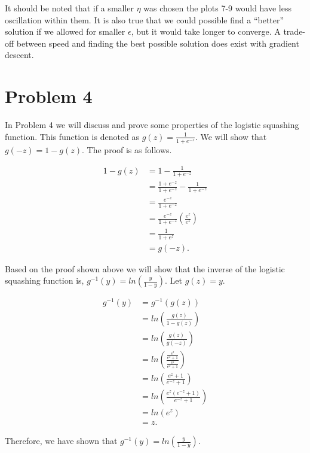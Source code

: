 \documentclass[paper=a4, fontsize=11pt]{scrartcl} %
\begin{document}
It should be noted that if a smaller $\eta$ was chosen the plots 7-9 would have less oscillation within them.
It is also true that we could possible find a ``better'' solution if we allowed for smaller $\epsilon$, but it would take longer to converge.
A trade-off between speed and finding the best possible solution does exist with gradient descent.

\section{Problem 4}

In Problem 4 we will discuss and prove some properties of the logistic squashing function.
This function is denoted as $g(z) = \frac{1}{1 + e^{-z}}$.  We will show that $g(-z) = 1 - g(z)$.  The proof is as follows.

\begin{align*}
1-g(z) &= 1- \frac{1}{1 + e^{-z}} \\
&= \frac{1 + e^{-z}}{1 + e^{-z}}- \frac{1}{1 + e^{-z}} \\
&= \frac{e^{-z}}{1 + e^{-z}} \\
&= \frac{e^{-z}}{1 + e^{-z}}(\frac{e^{z}}{e^{z}}) \\
&= \frac{1}{1 + e^{z}} \\
&= g(-z).
\end{align*}

Based on the proof shown above we will show that the inverse of the logistic squashing function is, $g^{-1}(y) = ln(\frac{y}{1-y})$.  Let $g(z) = y$.

\begin{align*}
g^{-1}(y) &= g^{-1}(g(z)) \\
&= ln(\frac{g(z)}{1-g(z)}) \\
&= ln(\frac{g(z)}{g(-z)}) \\
&= ln(\frac{\frac{e^{z}}{e^{z}+1}}{\frac{e^{z}}{e^{z}+1}}) \\
&= ln(\frac{e^z + 1}{e^{-z} + 1})\\
&= ln(\frac{e^{z}(e^{-z}+1)}{e^{-z}+1})\\
&= ln(e^{z})\\
&= z.
\end{align*}

Therefore, we have shown that $g^{-1}(y) = ln(\frac{y}{1-y})$.
\end{document}
